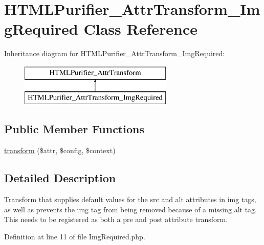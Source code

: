 \hypertarget{classHTMLPurifier__AttrTransform__ImgRequired}{\section{H\+T\+M\+L\+Purifier\+\_\+\+Attr\+Transform\+\_\+\+Img\+Required Class Reference}
\label{classHTMLPurifier__AttrTransform__ImgRequired}
}
Inheritance diagram for H\+T\+M\+L\+Purifier\+\_\+\+Attr\+Transform\+\_\+\+Img\+Required\+:\begin{figure}[H]
\begin{center}
\leavevmode
\includegraphics[height=2.000000cm]{classHTMLPurifier__AttrTransform__ImgRequired}
\end{center}
\end{figure}
\subsection*{Public Member Functions}
\begin{DoxyCompactItemize}
\item 
\hyperlink{classHTMLPurifier__AttrTransform__ImgRequired_a00797c838cd0884d9646a08533e2a41e}{transform} (\$attr, \$config, \$context)
\end{DoxyCompactItemize}


\subsection{Detailed Description}
Transform that supplies default values for the src and alt attributes in img tags, as well as prevents the img tag from being removed because of a missing alt tag. This needs to be registered as both a pre and post attribute transform. 

Definition at line 11 of file Img\+Required.\+php.



